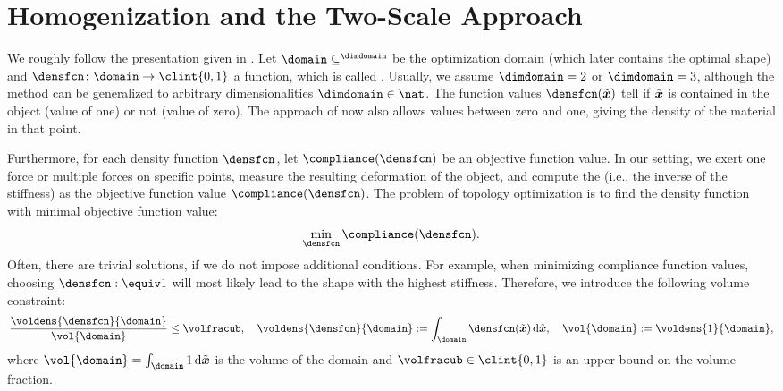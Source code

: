 \section{Homogenization and the Two-Scale Approach}
\label{sec:61homogenization}

We roughly follow the presentation given in
.
Let $\domain \subset \real^{\dimdomain}$ be the optimization domain
(which later contains the optimal shape) and
$\densfcn\colon \domain \to \clint{0, 1}$ a function,
which is called .
Usually, we assume $\dimdomain = 2$ or $\dimdomain = 3$,
although the method can be generalized to
arbitrary dimensionalities $\dimdomain \in \nat$.
The function values $\densfcn(\tilde{\*x})$ tell if $\tilde{{\boldsymbol{x}}}$
is contained in the object (value of one) or not (value of zero).
The approach of  now also allows values between
zero and one, giving the density of the material in that point.

Furthermore, for each density function $\densfcn$,
let $\compliance(\densfcn)$ be an objective function value.
In our setting,
we exert one force or multiple forces on specific points,
measure the resulting deformation of the object, and
compute the  (i.e., the inverse of the stiffness) as
the objective function value $\compliance(\densfcn)$.
The problem of topology optimization is to find the density function
with minimal objective function value:
\begin{equation}
  \label{eq:topoOptProblemContinuous}
  \min_{\densfcn} \compliance(\densfcn).
\end{equation}
Often, there are trivial solutions, if we do not impose additional conditions.
For example, when minimizing compliance function values,
choosing $\densfcn :\equiv 1$ will most likely lead to the shape with the
highest stiffness.
Therefore, we introduce the following volume constraint:
\begin{equation}
  \frac{\voldens{\densfcn}{\domain}}{\vol{\domain}} \le \volfracub,\quad
  \voldens{\densfcn}{\domain}
  := \int_{\domain} \densfcn(\tilde{\*x}) \diff\tilde{\*x},\quad
  \vol{\domain}
  := \voldens{1}{\domain},
\end{equation}
where $\vol{\domain} = \int_{\domain} 1 \diff\tilde{\*x}$
is the volume of the domain and
$\volfracub \in \clint{0, 1}$ is an upper bound on the volume fraction.

